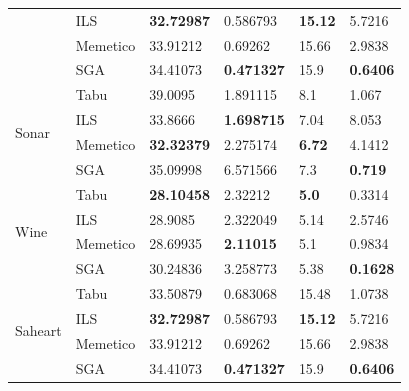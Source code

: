 \documentclass[11pt]{article}
\begin{document}
\begin{table}[h]
{\begin{tabular}{ |l|l|l|l|l|l| }
                              & ILS      & \bf{32.72987}   & 0.586793     &  \bf{15.12}  & 5.7216 \\
                              & Memetico & 33.91212   & 0.69262      &  15.66  & 2.9838 \\
                              & SGA      & 34.41073   & \bf{0.471327}     &  15.9   & \bf{0.6406}\\ \hline
    \multirow{4}{*}{Sonar}  & Tabu     & 39.0095    & 1.891115     &  8.1    & 1.067 \\
                            & ILS      & 33.8666    & \bf{1.698715}     &  7.04   & 8.053 \\
                            & Memetico & \bf{32.32379}   & 2.275174     &  \bf{6.72}   & 4.1412 \\
                            & SGA      & 35.09998   & 6.571566     &  7.3    & \bf{0.719}\\ \hline
    \multirow{4}{*}{Wine} & Tabu     & \bf{28.10458}   &  2.32212     &  \bf{5.0}      & 0.3314 \\
                          & ILS      & 28.9085    &  2.322049    &  5.14   & 2.5746 \\
                          & Memetico & 28.69935   &  \bf{2.11015}     &  5.1    & 0.9834 \\
                          & SGA      & 30.24836   &  3.258773    &  5.38   & \bf{0.1628}\\ \hline
    \multirow{4}{*}{Saheart}  & Tabu     & 33.50879   & 0.683068     &  15.48  & 1.0738 \\
                              & ILS      & \bf{32.72987}   & 0.586793     &  \bf{15.12}  & 5.7216 \\
                              & Memetico & 33.91212   & 0.69262      &  15.66  & 2.9838 \\
                              & SGA      & 34.41073   & \bf{0.471327}     &  15.9   & \bf{0.6406}\\ \hline
\end{tabular}
}
\end{table}

\newpage
\end{document}
